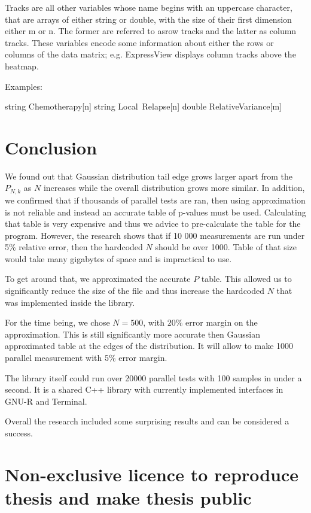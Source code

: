 \documentclass[12pt]{article}
\begin{document}
{Tracks are all other variables whose name begins with an uppercase character, that are arrays of either string or double, with the size of their first dimension either m or n. The former are referred to asrow tracks and the latter as column tracks. These variables encode some information about either the rows or columns of the data matrix; e.g. ExpressView displays column tracks above the heatmap.

Examples:

string Chemotherapy[n]
string Local\ Relapse[n]
double RelativeVariance[m]
\newpage

\section{Conclusion}
We found out that Gaussian distribution tail edge grows larger apart from the $P_{N, k}$ as $N$ increases while the overall distribution grows more similar. In addition, we confirmed that if thousands of parallel tests are ran, then using approximation is not reliable and instead an accurate table of p-values must be used. Calculating that table is very expensive and thus we advice to pre-calculate the table for the program. However, the research shows that if 10 000 measurements are run under 5\% relative error, then the hardcoded $N$ should be over 1000. Table of that size would take many gigabytes of space and is impractical to use.

To get around that, we approximated the accurate $P$ table. This allowed us to significantly reduce the size of the file and thus increase the hardcoded $N$ that was implemented inside the library.

For the time being, we chose $N=500$, with $20\%$ error margin on the approximation. This is still significantly more accurate then Gaussian approximated table at the edges of the distribution. It will allow to make 1000 parallel measurement with 5\% error margin.

The library itself could run over 20000 parallel tests with 100 samples in under a second. It is a shared C++ library with currently implemented interfaces in GNU-R and Terminal.

Overall the research included some surprising results and can be considered a success.

\newpage




\appendix
\pagebreak

\section*{\small Non-exclusive licence to reproduce thesis and make thesis public}

}
\end{document}
